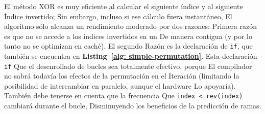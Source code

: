 ﻿\documentclass[10pt]{article}
\begin{document}
El método XOR es muy eficiente al calcular el siguiente índice y al siguiente
Índice invertido; Sin embargo, incluso si ese cálculo fuera instantáneo,
El algoritmo sólo alcanza un rendimiento moderado por dos razones:
Primera razón es que no se accede a los índices invertidos en un
De manera contigua (y por lo tanto no se optimizan en caché). El segundo
Razón es la declaración de {\tt if}, que también se encuentra en {\bf Listing~\ref{alg: simple-permutation}}. Esta declaración {\tt if}
Que el desenrollado de bucles sea totalmente efectivo, porque
El compilador no sabrá todavía los efectos de la permutación en el
Iteración (limitando la posibilidad de intercambiar en paralelo, aunque el hardware
Lo apoyaría). También debe tenerse en cuenta que la frecuencia
Que {\tt index < rev(index)} cambiará durante el bucle,
Disminuyendo los beneficios de la predicción de ramas.
\end{document}
